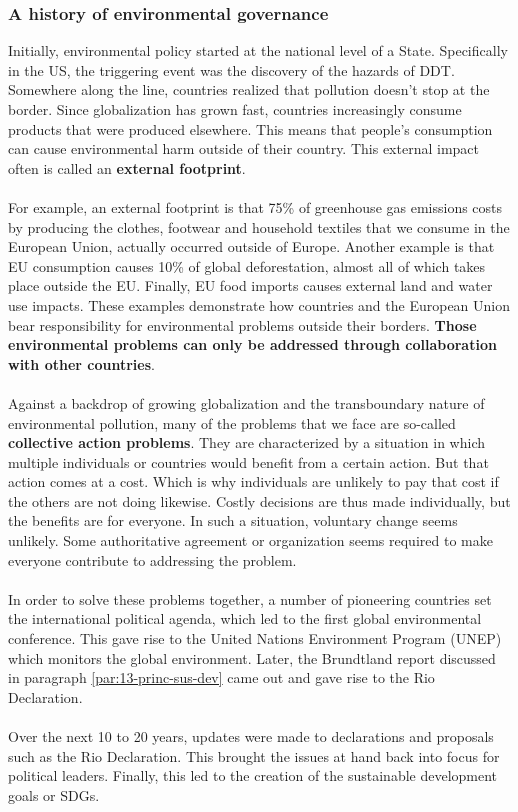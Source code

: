 \documentclass[../summary.tex]{subfiles}
\begin{document}
		\subsubsection{A history of environmental governance}
			Initially, environmental policy started at the national level of a State. Specifically in the US, the triggering event was the discovery of the hazards of DDT. Somewhere along the line, countries realized that pollution doesn't stop at the border. Since globalization has grown fast, countries increasingly consume products that were produced elsewhere.
			This means that people's consumption can cause environmental harm outside of their country. This external impact often is called an \textbf{external footprint}. \\
			\\
			For example, an external footprint is that 75\% of greenhouse gas emissions costs by producing the clothes, footwear and household textiles that we consume in the European Union, actually occurred outside of Europe. Another example is that EU consumption causes 10\% of global deforestation, almost all of which takes place outside the EU. Finally, EU food imports causes external land and water use impacts. These examples demonstrate how countries and the European Union bear responsibility for environmental problems outside their borders. \textbf{Those environmental problems can only be addressed through collaboration with other countries}.\\
			\\
			Against a backdrop of growing globalization and the transboundary nature of environmental pollution, many of the problems that we face are so-called \textbf{collective action problems}. They are characterized by a situation in which multiple individuals or countries would benefit from a certain action. But that action comes at a cost. Which is why individuals are unlikely to pay that cost if the others are not doing likewise. Costly decisions are thus made individually, but the benefits are for everyone. In such a situation, voluntary change seems unlikely. Some authoritative agreement or organization seems required to make everyone contribute to addressing the problem.\\
			\\
			In order to solve these problems together, a number of pioneering countries set the international political agenda, which led to the first global environmental conference. This gave rise to the United Nations Environment Program (UNEP) which monitors the global environment. Later, the Brundtland report discussed in paragraph \ref{par:13-princ-sus-dev} came out and gave rise to the Rio Declaration. \\
			\\
			Over the next 10 to 20 years, updates were made to declarations and proposals such as the Rio Declaration. This brought the issues at hand back into focus for political leaders. Finally, this led to the creation of the sustainable development goals or SDGs. 
		
\end{document}
